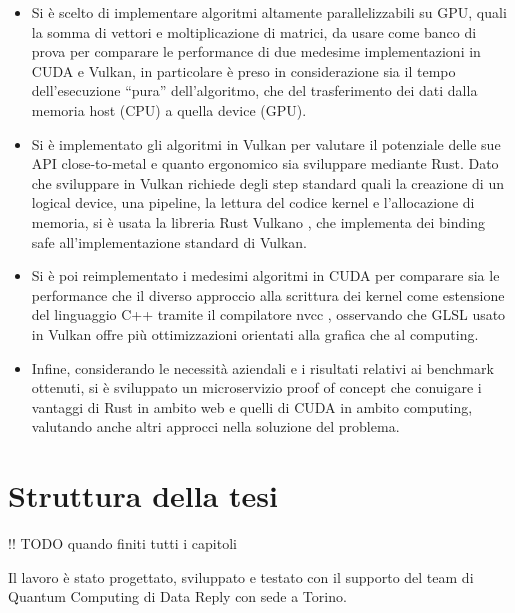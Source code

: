 \begin{itemize}
    \item Si è scelto di implementare algoritmi altamente parallelizzabili su GPU, quali la somma di vettori e moltiplicazione di matrici, da usare come banco di prova per comparare le performance di due medesime implementazioni in CUDA e Vulkan, in particolare è preso in considerazione sia il tempo dell'esecuzione ``pura'' dell'algoritmo, che del trasferimento dei dati dalla memoria host (CPU) a quella device (GPU).
    \item Si è implementato gli algoritmi in Vulkan per valutare il potenziale delle sue API close-to-metal e quanto ergonomico sia sviluppare mediante Rust. Dato che sviluppare in Vulkan richiede degli step standard quali la creazione di un logical device, una pipeline, la lettura del codice kernel e l'allocazione di memoria, si è usata la libreria Rust Vulkano \cite[]{github:Vulkano}, che implementa dei binding safe all'implementazione standard di Vulkan.
    \item Si è poi reimplementato i medesimi algoritmi in CUDA per comparare sia le performance che il diverso approccio alla scrittura dei kernel come estensione del linguaggio C++ tramite il compilatore nvcc \cite[]{Nvidia:nvcc}, osservando che GLSL \cite[]{KG:GLSL} usato in Vulkan offre più ottimizzazioni orientati alla grafica che al computing.
    \item Infine, considerando le necessità aziendali e i risultati relativi ai benchmark ottenuti, si è sviluppato un microservizio proof of concept che conuigare i vantaggi di Rust in ambito web e quelli di CUDA in ambito computing, valutando anche altri approcci nella soluzione del problema.
\end{itemize}



\section[Struttura della tesi]{Struttura della tesi}

!! TODO quando finiti tutti i capitoli

Il lavoro è stato progettato, sviluppato e testato con il supporto del team di Quantum Computing di Data Reply con sede a Torino. 

